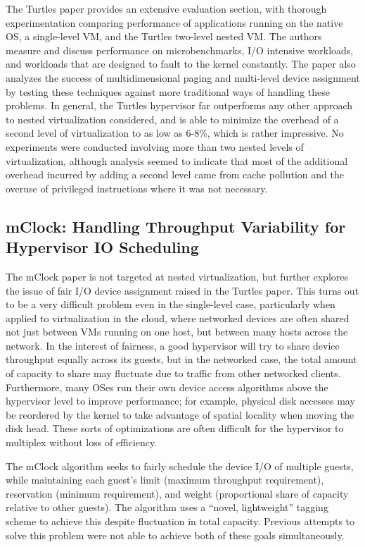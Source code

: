 \documentclass[10pt]{article}
\begin{document}
\begin{multicols*}{2}
The Turtles paper provides an extensive evaluation section, with thorough experimentation
comparing performance of applications running on the native OS, a single-level VM, and the
Turtles two-level nested VM.  The authors measure and discuss performance on microbenchmarks,
I/O intensive workloads, and workloads that are designed to fault to the kernel constantly.
The paper also analyzes the success of multidimensional paging and multi-level device
assignment by testing these techniques against more traditional ways of handling these
problems.  In general, the Turtles hypervisor far outperforms any other approach to
nested virtualization considered, and is able to minimize the overhead of a second
level of virtualization to as low as 6-8\%, which is rather impressive.  No experiments
were conducted involving more than two nested levels of virtualization, although analysis
seemed to indicate that most of the additional overhead incurred by adding a second level
came from cache pollution and the overuse of privileged instructions where it was not
necessary.

\subsection{mClock: Handling Throughput Variability for Hypervisor IO Scheduling}
\label{sec:summaries/mclock}

The mClock paper \cite{ref:mclock} is not targeted at nested virtualization,
but further explores
the issue of fair I/O device assignment raised in the Turtles paper.  This turns
out to be a very difficult problem even in the single-level case, particularly
when applied to virtualization in the cloud, where networked devices are
often shared not just between VMs running on one host, but between many hosts
across the network.  In the interest of fairness, a good hypervisor will try to
share device throughput equally across its guests, but in the networked case, the
total amount of capacity to share may fluctuate due to traffic from other
networked clients.  Furthermore, many OSes run their own device access algorithms
above the hypervisor level to improve performance; for example, physical disk
accesses may be reordered by the kernel to take advantage of spatial locality
when moving the disk head.  These sorts of optimizations are often difficult
for the hypervisor to multiplex without loss of efficiency.

The mClock algorithm seeks to fairly schedule the device I/O of multiple guests,
while maintaining each guest's limit (maximum throughput requirement), reservation
(minimum requirement), and weight (proportional share of capacity relative to
other guests).  The algorithm uses a ``novel, lightweight'' tagging scheme to
achieve this despite fluctuation in total capacity.  Previous attempts to solve
this problem were not able to achieve both of these goals simultaneously.


\end{multicols*}
\end{document}
